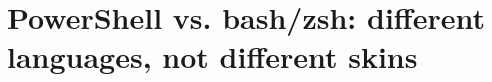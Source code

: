 \chapter{PowerShell vs. bash/zsh: different languages, not different skins}
\label{ch:powershell-vs-bash-zsh-different}

